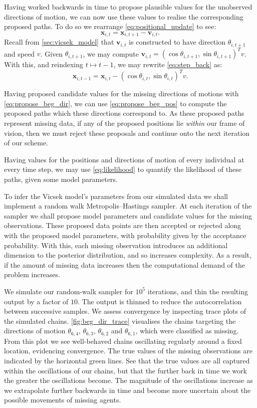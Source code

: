 Having worked backwards in time to propose plausible values for the unobserved
directions of motion, we can now use these values to realise the corresponding
proposed paths. To do so we rearrange \cref{eq:positional_update} to see:
\begin{equation}
  \label{eq:step_back}
  \bm{x}_{i,t} = \bm{x}_{i,t+1} - \bm{v}_{i,t}.
\end{equation}
Recall from \cref{sec:vicsek_model} that $\bm{v}_{i,t}$ is constructed to have
direction $\theta_{i,t+1}$ and speed $v$. Given $\theta_{i,t+1}$, we may
compute $\bm{v}_{i,t} = (\cos\theta_{i,t+1}, \sin\theta_{i,t+1})^Tv$. With
this, and reindexing $t\mapsto t-1$, we may rewrite \cref{eq:step_back} as:
\begin{equation}
  \label{eq:propose_beg_pos}
  \bm{x}_{i,t-1} = \bm{x}_{i,t} - (\cos\theta_{i,t}, \sin\theta_{i,t})^Tv.
\end{equation}

Having proposed candidate values for the missing directions of motions with
\cref{eq:propose_beg_dir}, we can use \cref{eq:propose_beg_pos} to compute the
proposed paths which these directions correspond to. As these proposed
paths represent missing data, if any of the proposed positions lie
\emph{within} our frame of vision, then we must reject these proposals and
continue onto the next iteration of our scheme.

Having values for the positions and directions of motion of every individual at
every time step, we may use \cref{eq:likelihood} to quantify the likelihood of
these paths, given some model parameters.

To infer the Vicsek model's parameters from our simulated data we shall
implement a random walk Metropolis--Hastings sampler. At each iteration of the
sampler we shall propose model parameters and candidate values for the missing
observations. These proposed data points are then accepted or rejected along
with the proposed model parameters, with probability given by the acceptance
probability. With this, each missing observation introduces an additional
dimension to the posterior distribution, and so increases complexity. As a
result, if the amount of missing data increases then the computational demand
of the problem increases.

We simulate our random-walk sampler for $10^5$ iterations, and thin the
resulting output by a factor of $10$. The output is thinned to reduce the
autocorrelation between successive samples. We assess convergence by inspecting
trace plots of the simulated chains. \cref{fig:beg_dir_trace} visualises the
chains targeting the directions of motion $\theta_{6,4}$, $\theta_{6,3}$,
$\theta_{6,2}$ and $\theta_{6,1}$, which were classified as missing. From this
plot we see well-behaved chains oscillating regularly around a fixed location,
evidencing convergence. The true values of the missing observations are
indicated by the horizontal green lines. See that the true values are all
captured within the oscillations of our chains, but that the further back in
time we work the greater the oscillations become. The magnitude of the
oscillations increase as we extrapolate further backwards in time and become
more uncertain about the possible movements of missing agents.

